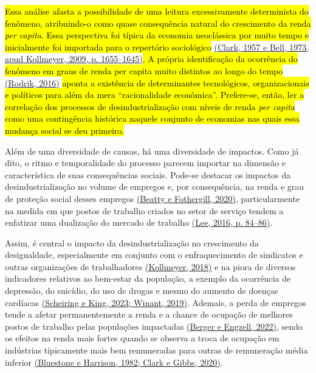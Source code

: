 \hl{Essa análise afasta a possibilidade de uma leitura excessivamente
determinista do fenômeno, atribuindo-o como quase consequência natural
do crescimento da renda \emph{per capita}. Essa perspectiva foi típica
da economia neoclássica por muito tempo e inicialmente foi importada
para o repertório sociológico}
\href{https://www.zotero.org/google-docs/?gypx9o}{(Clark, 1957 e Bell,
1973, apud Kollmeyer, 2009, p. 1655--1645)}\hl{. A própria identificação
da ocorrência do fenômeno em graus de renda per capita muito distintos
ao longo do tempo}
\href{https://www.zotero.org/google-docs/?h6IPTX}{(Rodrik, 2016)}
\hl{aponta a existência de determinantes tecnológicos, organizacionais e
políticos para além da mera ``racionalidade econômica''. Prefere-se,
então, ler a correlação dos processos de desindustrialização com níveis
de renda \emph{per capita} como uma contingência histórica naquele
conjunto de economias nas quais essa mudança social se deu primeiro.}

Além de uma diversidade de causas, há uma diversidade de impactos. Como
já dito, o ritmo e temporalidade do processo parecem importar na
dimensão e característica de suas consequências sociais. Pode-se
destacar os impactos da desindustrialização no volume de empregos e, por
consequência, na renda e grau de proteção social desses empregos
\href{https://www.zotero.org/google-docs/?8tCeXm}{(Beatty e Fothergill,
2020)}, particularmente na medida em que postos de trabalho criados no
setor de serviço tendem a enfatizar uma dualização do mercado de
trabalho \href{https://www.zotero.org/google-docs/?pcGMyP}{(Lee, 2016,
p. 84--86)}.

Assim, é central o impacto da desindustrialização no crescimento da
desigualdade, especialmente em conjunto com o enfraquecimento de
sindicatos e outras organizações de trabalhadores
\href{https://www.zotero.org/google-docs/?cyxUuH}{(Kollmeyer, 2018)} e
na piora de diversos indicadores relativos ao bem-estar da população, a
exemplo da ocorrência de depressão, do suicídio, do uso de drogas e
mesmo do aumento de doenças cardíacas
\href{https://www.zotero.org/google-docs/?zmiS6A}{(Scheiring e King,
2023; Winant, 2019)}. Ademais, a perda de empregos tende a afetar
permanentemente a renda e a chance de ocupação de melhores postos de
trabalho pelas populações impactadas
\href{https://www.zotero.org/google-docs/?VjAxkf}{(Berger e Engzell,
2022)}, sendo os efeitos na renda mais fortes quando se observa a troca
de ocupação em indústrias tipicamente mais bem remuneradas para outras
de remuneração média inferior
\href{https://www.zotero.org/google-docs/?hD6Aqa}{(Bluestone e Harrison,
1982; Clark e Gibbs, 2020)}.

